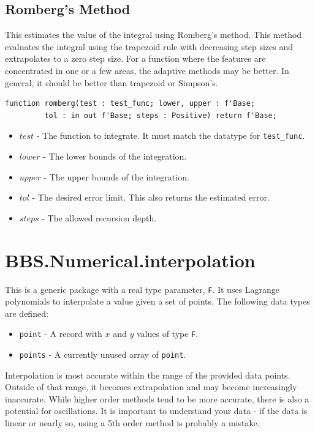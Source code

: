 \documentclass[10pt, openany]{book}
\newcommand{\indexfunc}[1]{\index[func]{#1}}
\newcommand{\datatype}[1]{\texttt{#1}}
\begin{document}
\subsection{Romberg's Method}
This estimates the value of the integral using Romberg's method.  This method evaluates the integral using the trapezoid rule with decreasing step sizes and extrapolates to a zero step size.  For a function where the features are concentrated in one or a few areas, the adaptive methods may be better.  In general, it should be better than trapezoid or Simpson's.
\begin{lstlisting}
function romberg(test : test_func; lower, upper : f'Base;
         tol : in out f'Base; steps : Positive) return f'Base;
\end{lstlisting}
\indexfunc{integ-romberg}
\begin{itemize}
  \item $test$ - The function to integrate.  It must match the datatype for \datatype{test\_func}.
  \item $lower$ - The lower bounds of the integration.
  \item $upper$ - The upper bounds of the integration.
  \item $tol$ - The desired error limit.  This also returns the estimated error.
  \item $steps$ - The allowed recursion depth.
\end{itemize}

\section{BBS.Numerical.interpolation}
This is a generic package with a real type parameter, \datatype{F}.  It uses Lagrange polynomials to interpolate a value given a set of points.  The following data types are defined:
\begin{itemize}
  \item \datatype{point} - A record with $x$ and $y$ values of type \datatype{F}.
  \item \datatype{points} - A currently unused array of \datatype{point}.
\end{itemize}
Interpolation is most accurate within the range of the provided data points.  Outside of that range, it becomes extrapolation and may become increasingly inaccurate.  While higher order methods tend to be more accurate, there is also a potential for oscillations.  It is important to understand your data - if the data is linear or nearly so, using a 5th order method is probably a mistake.
\end{document}
